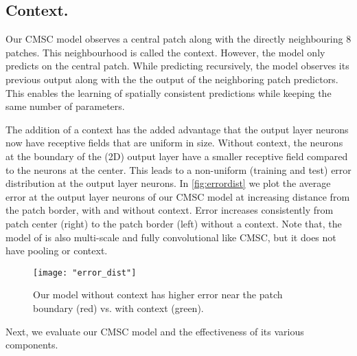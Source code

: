 \subsection{Context.} 
Our CMSC model observes a central patch along with the directly neighbouring 8 patches. This neighbourhood is called the context. However, the model only predicts on the central patch. While predicting recursively, the model observes its previous output along with the the output of the neighboring patch predictors. This enables the learning of spatially consistent predictions while keeping the same number of parameters.

The addition of a context has the added advantage that the output layer neurons now have receptive fields that are uniform in size. Without context, the neurons at the boundary of the (2D) output layer have a smaller receptive field compared to the neurons at the center. This leads to a non-uniform (training and test) error distribution at the output layer neurons. In \autoref{fig:errordist} we plot the average error at the output layer neurons of our CMSC model at increasing distance from the patch border, with and without context. Error increases consistently from patch center (right) to the patch border (left) without a context. Note that, the model of \cite{mathieu2015deep} is also multi-scale and fully convolutional like CMSC, but it does not have pooling or context.

\begin{figure}[h]
    \centering
    \texttt{[image: "error\_dist"]}
    \caption{Our model without context has higher error near the patch boundary (red) vs. with context (green).}
    \label{fig:errordist}
\end{figure}


Next, we evaluate our CMSC model and the effectiveness of its various components.